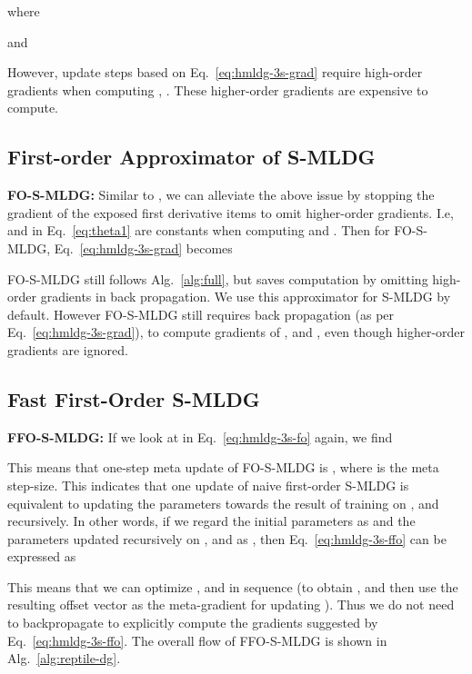 \documentclass[runningheads]{llncs}
\newcommand{\nameS}{S-MLDG}
\newcommand{\nameFS}{FO-\nameS}
\newcommand{\nameFFS}{FFO-\nameS}
\newcommand{\keypoint}[1]{\vspace{0.1cm}\noindent\textbf{#1}\quad}
\begin{document}
\normalsize
where
\small

\normalsize
and
\small

\normalsize



\noindent However, update steps based on Eq.~\ref{eq:hmldg-3s-grad} require high-order gradients when computing , . These higher-order gradients are expensive to compute. 

\subsection{First-order Approximator of \nameS{}} 
\keypoint{\nameFS{}:} 
Similar to \cite{finn2017model}, we can alleviate the above issue by stopping the gradient of the exposed first derivative items to omit higher-order gradients. I.e,  and  in Eq.~\ref{eq:theta1} are constants when computing  and . Then for \nameFS{}, Eq.~\ref{eq:hmldg-3s-grad} becomes
\small

\normalsize
\nameFS{} still follows Alg.~\ref{alg:full}, but saves computation by omitting high-order gradients in back propagation. We use this approximator for \nameS{} by default.
However \nameFS{} still requires back propagation (as per Eq.~\ref{eq:hmldg-3s-grad}), to compute gradients of ,  and , even though higher-order gradients are ignored.



\subsection{Fast First-Order \nameS{}}
\keypoint{\nameFFS{}:} If we look at  in Eq.~\ref{eq:hmldg-3s-fo} again, we find
\small

\normalsize
This means that one-step meta update of \nameFS{} is , where  is the meta step-size. This indicates that one update of naive first-order \nameS{} is equivalent to updating the parameters towards the result of training on ,  and  recursively. In other words, if we regard the initial parameters as  and the parameters updated recursively on ,  and  as , then Eq.~\ref{eq:hmldg-3s-ffo} can be expressed as
\small

\normalsize

This means that we can optimize ,  and  in sequence (to obtain , and then use the resulting offset vector as the meta-gradient for updating ). Thus we do not need to backpropagate to explicitly compute the gradients suggested by Eq.~\ref{eq:hmldg-3s-ffo}. 
The overall flow of \nameFFS{} is shown in Alg.~\ref{alg:reptile-dg}.
\end{document}
